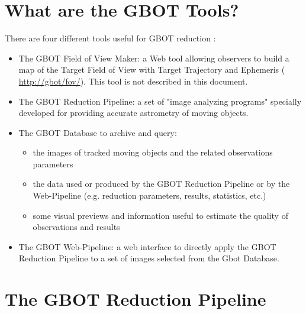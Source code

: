 \section{What are the GBOT Tools?}
There are four different tools useful for GBOT reduction : 
\begin{itemize}
\item The GBOT Field of View Maker: a Web tool allowing observers to build a map of the Target Field of View with Target Trajectory and Ephemeris ( \url{http://gbot/fov/}). This tool is not described in this document.
\item The GBOT Reduction Pipeline: a set of "image analyzing programs" specially developed for providing accurate astrometry of moving objects. 
\item The GBOT Database to archive and query:
                \begin{itemize}
                \item the images of tracked moving objects and the related observations parameters
                \item the data used or produced by the GBOT Reduction Pipeline or by the Web-Pipeline (e.g. reduction parameters, results, statistics, etc.)
                \item some visual previews and information useful to estimate the quality of observations and results
                \end{itemize}  
\item The GBOT Web-Pipeline: a web interface to directly apply the GBOT Reduction Pipeline to a set of images selected from the Gbot Database.                                    
\end{itemize}


\section{The GBOT Reduction Pipeline}

